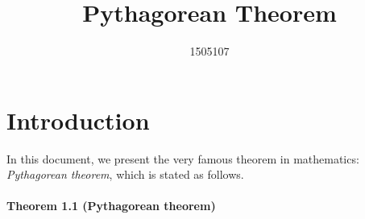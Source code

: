 \documentclass[14pt]{article}
\title{Pythagorean Theorem}
\author{1505107}
\begin{document}
\maketitle



\section{Introduction}
In this document, we present the very famous theorem in mathematics: \textit{ Pythagorean
theorem}, which is stated as follows.\\
\\
\textbf{Theorem 1.1 (Pythagorean theorem)}
\end{document}
